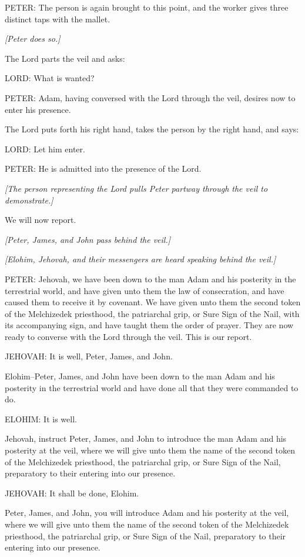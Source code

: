 			PETER: The person is again brought to this point, and the worker gives three distinct taps with the mallet.

			\textit{[Peter does so.]}

			The Lord parts the veil and asks:

			LORD: What is wanted?

			PETER: Adam, having conversed with the Lord through the veil, desires now to enter his presence.

			The Lord puts forth his right hand, takes the person by the right hand, and says:

			LORD: Let him enter.

			PETER: He is admitted into the presence of the Lord.

			\textit{[The person representing the Lord pulls Peter partway through the veil to demonstrate.]}

			We will now report.

			\textit{[Peter, James, and John pass behind the veil.]}
			
			\textit{[Elohim, Jehovah, and their messengers are heard speaking behind the veil.]}

			PETER: Jehovah, we have been down to the man Adam and his posterity in the terrestrial world, and have given unto them the law of consecration, and have caused them to receive it by covenant. We have given unto them the second token of the Melchizedek priesthood, the patriarchal grip, or Sure Sign of the Nail, with its accompanying sign, and have taught them the order of prayer. They are now ready to converse with the Lord through the veil. This is our report.

			JEHOVAH: It is well, Peter, James, and John.

			Elohim--Peter, James, and John have been down to the man Adam and his posterity in the terrestrial world and have done all that they were commanded to do.

			ELOHIM: It is well.

			Jehovah, instruct Peter, James, and John to introduce the man Adam and his posterity at the veil, where we will give unto them the name of the second token of the Melchizedek priesthood, the patriarchal grip, or Sure Sign of the Nail, preparatory to their entering into our presence.

			JEHOVAH: It shall be done, Elohim.

			Peter, James, and John, you will introduce Adam and his posterity at the veil, where we will give unto them the name of the second token of the Melchizedek priesthood, the patriarchal grip, or Sure Sign of the Nail, preparatory to their entering into our presence.

